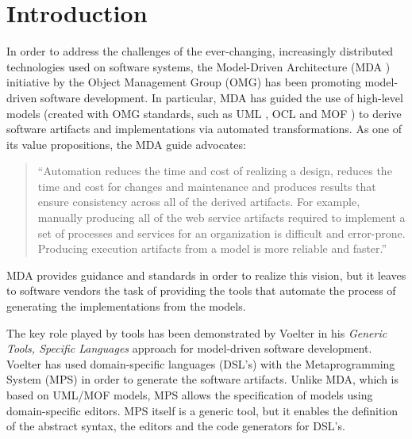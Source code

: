 \section{Introduction}
%
In order to address the challenges of the ever-changing,
increasingly distributed technologies used on software systems,
the Model-Driven Architecture (MDA \cite{mda}) initiative by the Object Management Group (OMG) has been promoting model-driven software development.
In particular, MDA has guided the use of high-level models (created with OMG standards,
such as UML \cite{uml}, OCL \cite{ocl} and MOF \cite{mof}) to derive software artifacts and implementations via automated transformations.
As one of its value propositions, the MDA guide \cite{mda} advocates:

\begin{quote}``Automation reduces the time and cost of realizing a design,
reduces the time and cost for changes and maintenance and produces results that ensure consistency across all of the derived artifacts.
For example, manually producing all of the web service artifacts required to implement a set of processes and services for an organization is difficult and error-prone.
Producing execution artifacts from a model is more reliable and faster.''\end{quote} 

MDA provides guidance and standards in order to realize this vision,
but it leaves to software vendors the task of providing the tools that automate the process of generating the implementations from the models.

The key role played by tools has been demonstrated by Voelter \cite{voelter} in his \emph{Generic Tools, Specific Languages} approach for model-driven software development.
Voelter \cite{voelter} has used domain-specific languages (DSL's) with the Metaprogramming System (MPS) in order to generate the software artifacts.
Unlike MDA, which is based on UML/MOF models,
MPS allows the specification of models using domain-specific editors.
MPS itself is a generic tool,
but it enables the definition of the abstract syntax, the editors and the code generators for DSL's.

